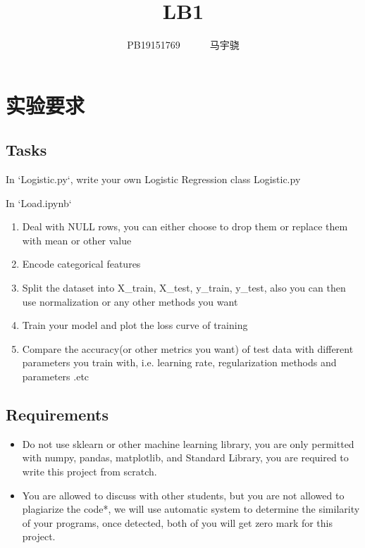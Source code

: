 \documentclass[UTF8,a4paper,AutoFakeBold,AutoFakeSlant]{article}
\title{\textbf{\textsf{{\textsf{LB1} \heiti{机器学习概论}}}}}
\author{\ssong PB19151769~~~~~~马宇骁}
\date{}
\begin{document}
\maketitle




\section{实验要求}

\subsection{Tasks}
In `​Logistic.py`, write your own Logistic Regression class Logistic.py

In `Load.ipynb`
\begin{enumerate}
  \item Deal with NULL rows, you can either choose to drop them or replace them with mean or other value
  \item Encode categorical features
  \item Split the dataset into X\_train, X\_test, y\_train, y\_test, also you can then use normalization or any other methods you want
  \item Train your model and plot the loss curve of training
  \item Compare the accuracy(or other metrics you want) of test data with different parameters you train with, i.e. learning rate, regularization methods and parameters .etc
\end{enumerate}


\subsection{Requirements}
\begin{itemize}
  \item Do not use sklearn or other machine learning library, you are only permitted with numpy, pandas, matplotlib, and Standard Library, you are required to write this project from scratch.
  \item You are allowed to discuss with other students, but you are not allowed to plagiarize the code*, we will use automatic system to determine the similarity of your programs, once detected, both of you will get zero mark for this project.
\end{itemize}
\end{document}
